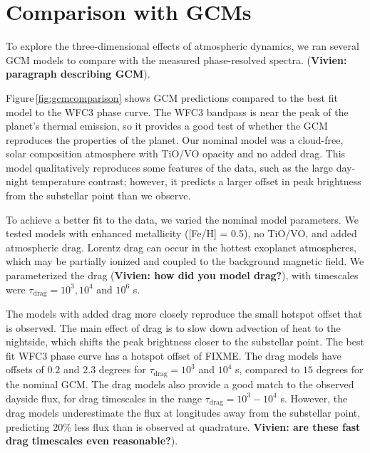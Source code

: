 \documentclass[twocolumn]{aastex61}
\begin{document}


\section{Comparison with GCMs}
\label{sec:gcm}
To explore the three-dimensional effects of atmospheric dynamics, we ran several GCM models to compare with the measured phase-resolved spectra. (\textbf{Vivien: paragraph describing GCM}).


Figure\,\ref{fig:gcmcomparison} shows GCM predictions compared to the best fit model to the WFC3 phase curve. The WFC3 bandpass is near the peak of the planet's thermal emission, so it provides a good test of whether the GCM reproduces the properties of the planet.  Our nominal model was a cloud-free, solar composition atmosphere with TiO/VO opacity and no added drag. This model qualitatively reproduces some features of the data, such as the large day-night temperature contrast; however, it predicts a larger offset in peak brightness from the substellar point than we observe. 

To achieve a better fit to the data, we varied the nominal model parameters. We tested models with enhanced metallicity ([Fe/H] = 0.5), no TiO/VO, and added atmospheric drag.  Lorentz drag can occur in the hottest exoplanet atmospheres, which may be partially ionized and coupled to the background magnetic field. We parameterized the drag (\textbf{Vivien: how did you model drag?}), with timescales were $\tau_\mathrm{drag} = 10^3, 10^4$ and $10^6$ s. 

The models with added drag more closely reproduce the small hotspot offset that is observed. The main effect of drag is to slow down advection of heat to the nightside, which shifts the peak brightness closer to the substellar point.  The best fit WFC3 phase curve has a hotspot offset of FIXME. The drag models have offsets of $0.2$ and $2.3$ degrees for $\tau_\mathrm{drag} = 10^3$ and $10^4$ s, compared to $15$ degrees for the nominal GCM.  The drag models also provide a good match to the observed dayside flux, for drag timescales in the range $\tau_\mathrm{drag} = 10^3 - 10^4$ s.  However, the drag models underestimate the flux at longitudes away from the substellar point, predicting 20\% less flux than is observed at quadrature. \textbf{Vivien: are these fast drag timescales even reasonable?}).
\end{document}

